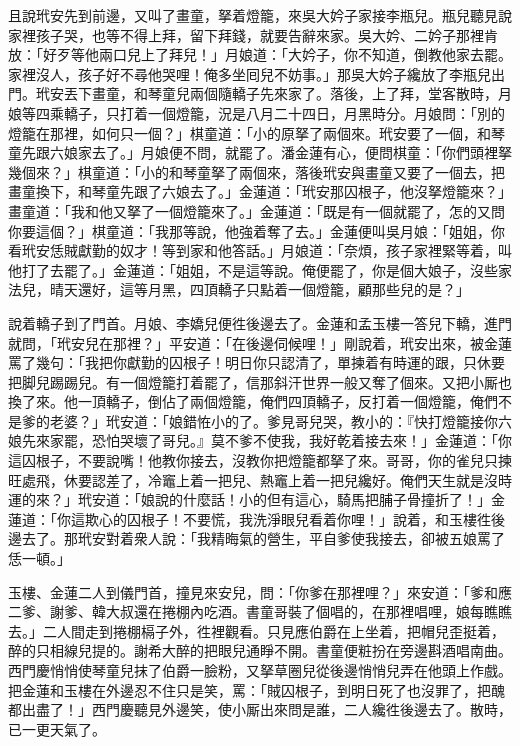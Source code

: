 且說玳安先到前邊，又叫了畫童，拏着燈籠，來吳大妗子家接李瓶兒。瓶兒聽見說家裡孩子哭，也等不得上拜，留下拜錢，就要告辭來家。吳大妗、二妗子那裡肯放：「好歹等他兩口兒上了拜兒！」月娘道：「大妗子，你不知道，倒教他家去罷。家裡沒人，孩子好不尋他哭哩！俺多坐囘兒不妨事。」那吳大妗子纔放了李瓶兒出門。玳安丟下畫童，和琴童兒兩個隨轎子先來家了。落後，上了拜，堂客散時，月娘等四乘轎子，只打着一個燈籠，況是八月二十四日，月黑時分。月娘問：「別的燈籠在那裡，如何只一個？」棋童道：「小的原拏了兩個來。玳安要了一個，和琴童先跟六娘家去了。」月娘便不問，就罷了。潘金蓮有心，便問棋童：「你們頭裡拏幾個來？」棋童道：「小的和琴童拏了兩個來，落後玳安與畫童又要了一個去，把畫童換下，和琴童先跟了六娘去了。」金蓮道：「玳安那囚根子，他沒拏燈籠來？」{}畫童道：「我和他又拏了一個燈籠來了。」金蓮道：「既是有一個就罷了，怎的又問你要這個？」棋童道：「我那等說，他強着奪了去。」金蓮便叫吳月娘：「姐姐，你看玳安恁賊獻勤的奴才！等到家和他答話。」月娘道：「奈煩，孩子家裡緊等着，叫他打了去罷了。」{}金蓮道：「姐姐，不是這等說。俺便罷了，你是個大娘子，沒些家法兒，晴天還好，這等月黑，四頂轎子只點着一個燈籠，顧那些兒的是？」

說着轎子到了門首。月娘、李嬌兒便徃後邊去了。金蓮和孟玉樓一答兒下轎，進門就問，「玳安兒在那裡？」平安道：「在後邊伺候哩！」剛說着，玳安出來，被金蓮罵了幾句：「我把你獻勤的囚根子！明日你只認清了，單揀着有時運的跟，只休要把脚兒踢踢兒。有一個燈籠打着罷了，信那斜汗世界一般又奪了個來。又把小厮也換了來。他一頂轎子，倒佔了兩個燈籠，俺們四頂轎子，反打着一個燈籠，俺們不是爹的老婆？」玳安道：「娘錯恠小的了。爹見哥兒哭，教小的：『快打燈籠接你六娘先來家罷，恐怕哭壞了哥兒。』莫不爹不使我，我好乾着接去來！」金蓮道：「你這囚根子，不要說嘴！他教你接去，沒教你把燈籠都拏了來。哥哥，你的雀兒只揀旺處飛，休要認差了，冷竈上着一把兒、熱竈上着一把兒纔好。俺們天生就是沒時運的來？」玳安道：「娘說的什麼話！小的但有這心，騎馬把脯子骨撞折了！」金蓮道：「你這欺心的囚根子！不要慌，我洗淨眼兒看着你哩！」說着，和玉樓徃後邊去了。那玳安對着衆人說：「我精晦氣的營生，平自爹使我接去，卻被五娘罵了恁一頓。」

玉樓、金蓮二人到儀門首，撞見來安兒，問：「你爹在那裡哩？」來安道：「爹和應二爹、謝爹、韓大叔還在捲棚內吃酒。書童哥裝了個唱的，在那裡唱哩，娘每瞧瞧去。」二人間走到捲棚槅子外，徃裡觀看。只見應伯爵在上坐着，把帽兒歪挺着，醉的只相線兒提的。謝希大醉的把眼兒通睜不開。書童便粧扮在旁邊斟酒唱南曲。西門慶悄悄使琴童兒抹了伯爵一臉粉，又拏草圈兒從後邊悄悄兒弄在他頭上作戲。把金蓮和玉樓在外邊忍不住只是笑，罵：「賊囚根子，到明日死了也沒罪了，把醜都出盡了！」西門慶聽見外邊笑，使小厮出來問是誰，二人纔徃後邊去了。散時，已一更天氣了。


